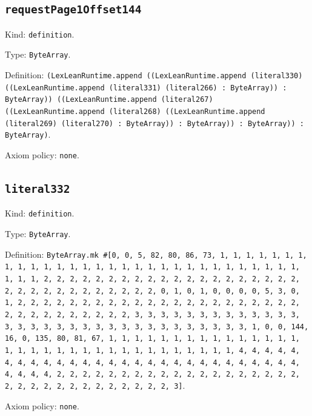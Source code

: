 \documentclass[11pt]{article}
\begin{document}
\subsection*{\texttt{requestPage1Offset144}}
\noindent Kind: \texttt{definition}.\par
\noindent Type: \texttt{ByteArray}.\par
\noindent Definition: \texttt{(LexLeanRuntime.append ((LexLeanRuntime.append (literal330) ((LexLeanRuntime.append (literal331) (literal266) : ByteArray)) : ByteArray)) ((LexLeanRuntime.append (literal267) ((LexLeanRuntime.append (literal268) ((LexLeanRuntime.append (literal269) (literal270) : ByteArray)) : ByteArray)) : ByteArray)) : ByteArray)}.\par
\noindent Axiom policy: \texttt{none}.\par
\subsection*{\texttt{literal332}}
\noindent Kind: \texttt{definition}.\par
\noindent Type: \texttt{ByteArray}.\par
\noindent Definition: \texttt{ByteArray.mk \#[0, 0, 5, 82, 80, 86, 73, 1, 1, 1, 1, 1, 1, 1, 1, 1, 1, 1, 1, 1, 1, 1, 1, 1, 1, 1, 1, 1, 1, 1, 1, 1, 1, 1, 1, 1, 1, 1, 1, 1, 2, 2, 2, 2, 2, 2, 2, 2, 2, 2, 2, 2, 2, 2, 2, 2, 2, 2, 2, 2, 2, 2, 2, 2, 2, 2, 2, 2, 2, 2, 2, 2, 0, 1, 0, 1, 0, 0, 0, 0, 5, 3, 0, 1, 2, 2, 2, 2, 2, 2, 2, 2, 2, 2, 2, 2, 2, 2, 2, 2, 2, 2, 2, 2, 2, 2, 2, 2, 2, 2, 2, 2, 2, 2, 2, 2, 3, 3, 3, 3, 3, 3, 3, 3, 3, 3, 3, 3, 3, 3, 3, 3, 3, 3, 3, 3, 3, 3, 3, 3, 3, 3, 3, 3, 3, 3, 3, 3, 1, 0, 0, 144, 16, 0, 135, 80, 81, 67, 1, 1, 1, 1, 1, 1, 1, 1, 1, 1, 1, 1, 1, 1, 1, 1, 1, 1, 1, 1, 1, 1, 1, 1, 1, 1, 1, 1, 1, 1, 1, 1, 1, 4, 4, 4, 4, 4, 4, 4, 4, 4, 4, 4, 4, 4, 4, 4, 4, 4, 4, 4, 4, 4, 4, 4, 4, 4, 4, 4, 4, 4, 4, 4, 4, 2, 2, 2, 2, 2, 2, 2, 2, 2, 2, 2, 2, 2, 2, 2, 2, 2, 2, 2, 2, 2, 2, 2, 2, 2, 2, 2, 2, 2, 2, 2, 2, 3]}.\par
\noindent Axiom policy: \texttt{none}.\par
\end{document}
